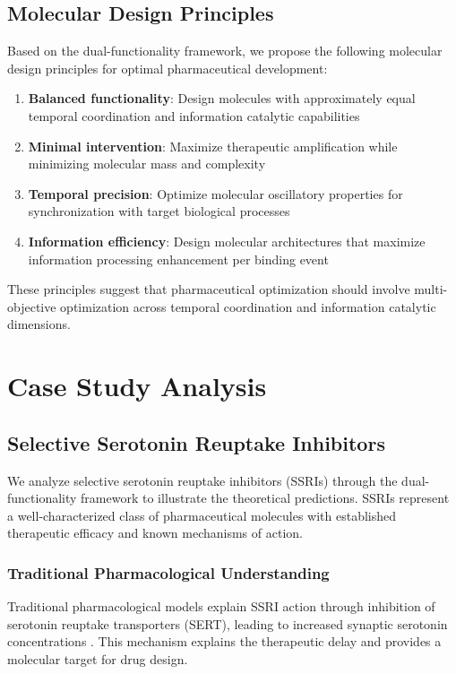 \documentclass[12pt,a4paper]{article}
\begin{document}
\subsection{Molecular Design Principles}

Based on the dual-functionality framework, we propose the following molecular design principles for optimal pharmaceutical development:

\begin{enumerate}
\item \textbf{Balanced functionality}: Design molecules with approximately equal temporal coordination and information catalytic capabilities
\item \textbf{Minimal intervention}: Maximize therapeutic amplification while minimizing molecular mass and complexity
\item \textbf{Temporal precision}: Optimize molecular oscillatory properties for synchronization with target biological processes
\item \textbf{Information efficiency}: Design molecular architectures that maximize information processing enhancement per binding event
\end{enumerate}

These principles suggest that pharmaceutical optimization should involve multi-objective optimization across temporal coordination and information catalytic dimensions.

\section{Case Study Analysis}

\subsection{Selective Serotonin Reuptake Inhibitors}

We analyze selective serotonin reuptake inhibitors (SSRIs) through the dual-functionality framework to illustrate the theoretical predictions. SSRIs represent a well-characterized class of pharmaceutical molecules with established therapeutic efficacy and known mechanisms of action.

\subsubsection{Traditional Pharmacological Understanding}

Traditional pharmacological models explain SSRI action through inhibition of serotonin reuptake transporters (SERT), leading to increased synaptic serotonin concentrations \citep{blier2013neurobiology}. This mechanism explains the therapeutic delay and provides a molecular target for drug design.
\end{document}
